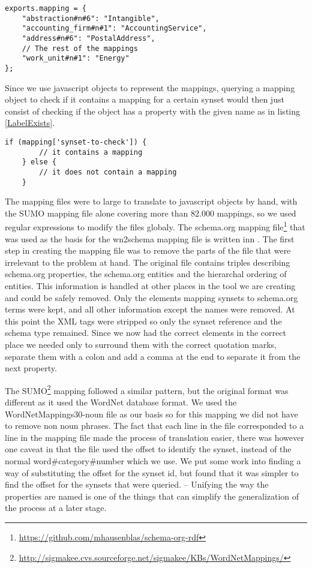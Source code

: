 \begin{lstlisting}[label=wn2schemaMapping, caption={Excerpt from the \href{https://github.com/EivindEE/Madame/blob/master/mappings/wn2schema.js}{wn2schema.js} mapping file}]
exports.mapping = {
	"abstraction#n#6": "Intangible",
	"accounting_firm#n#1": "AccountingService",
	"address#n#6": "PostalAddress",
	// The rest of the mappings
	"work_unit#n#1": "Energy"
};
\end{lstlisting}

Since we use javascript objects to represent the mappings,
querying a mapping object to check if it contains a mapping for a certain synset would then just consist of checking if
the object has a property with the given name as in listing \ref{LabelExists}.
\begin{lstlisting}[label=LabelExists,caption=Testing if a mapping exists]
	if (mapping['synset-to-check']) {
		// it contains a mapping
	} else {
		// it does not contain a mapping
	}
\end{lstlisting}

The mapping files were to large to translate to javascript objects by hand, with the SUMO mapping file alone
covering more than 82.000 mappings, so we used regular expressions to modify the files globaly.
The schema.org mapping file\footnote{\url{https://github.com/mhausenblas/schema-org-rdf}}
that was used as the basis for the wn2schema mapping file is written inn .
The first step in creating the mapping file was to remove the parts of the file that were irrelevant to the problem at hand.
The original file contains triples describing schema.org properties,
the schema.org entities and the hierarchal ordering of entities.
This information is handled at other places in the tool we are creating and could be safely removed.
Only the elements mapping synsets to schema.org terms were kept, and all other information except the names were removed.
At this point the XML tags were stripped so only the synset reference and the schema type remained.
Since we now had the correct elements in the correct place we needed only to surround them with the correct quotation
marks, separate them with a colon and add a comma at the end to separate it from the next property.

The SUMO\footnote{\url{http://sigmakee.cvs.sourceforge.net/sigmakee/KBs/WordNetMappings/}} mapping followed a similar pattern,
but the original format was different as it used the WordNet database format.
We used the WordNetMappings30-noun file as our basis so for this mapping we did not have to remove non noun phrases.
The fact that each line in the file corresponded to a line in the mapping file made the process of translation easier,
there was however one caveat in that the file used the offset to identify the synset,
instead of the normal word\#category\#number which we use.
We put some work into finding a way of substituting the offset for the synset id,
but found that it was simpler to find the offset for the synsets that were queried.
-- Unifying the way the properties are named is one of the things that can simplify the generalization of the process at a later stage.



